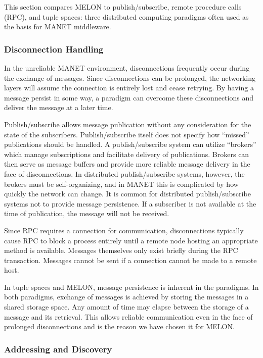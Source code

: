 \documentclass{llncs}
\begin{document}
This section compares MELON to publish/subscribe, remote procedure calls (RPC), and tuple spaces: three distributed computing paradigms often used as the basis for MANET middleware.

\subsubsection{Disconnection Handling}

In the unreliable MANET environment, disconnections frequently occur during the exchange of messages. Since disconnections can be prolonged, the networking layers will assume the connection is entirely lost and cease retrying. By having a message persist in some way, a paradigm can overcome these disconnections and deliver the message at a later time.

Publish/subscribe allows message publication without any consideration for the state of the subscribers. Publish/subscribe itself does not specify how ``missed'' publications should be handled. A publish/subscribe system can utilize ``brokers'' which manage subscriptions and facilitate delivery of publications. Brokers can then serve as message buffers and provide more reliable message delivery in the face of disconnections. In distributed publish/subscribe systems, however, the brokers must be self-organizing, and in MANET this is complicated by how quickly the network can change. It is common for distributed publish/subscribe systems not to provide message persistence. If a subscriber is not available at the time of publication, the message will not be received.

Since RPC requires a connection for communication, disconnections typically cause RPC to block a process entirely until a remote node hosting an appropriate method is available. Messages themselves only exist briefly during the RPC transaction. Messages cannot be sent if a connection cannot be made to a remote host.
    
In tuple spaces and MELON, message persistence is inherent in the paradigms. In both paradigms, exchange of messages is achieved by storing the messages in a shared storage space. Any amount of time may elapse between the storage of a message and its retrieval. This allows reliable communication even in the face of prolonged disconnections and is the reason we have chosen it for MELON.

\subsubsection{Addressing and Discovery}
\end{document}
